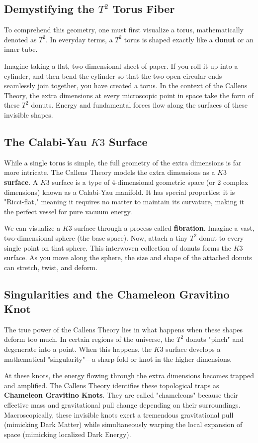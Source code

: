 \documentclass[a4paper,12pt]{article}
\begin{document}
\subsection{Demystifying the $T^2$ Torus Fiber}
To comprehend this geometry, one must first visualize a torus, mathematically denoted as $T^2$. In everyday terms, a $T^2$ torus is shaped exactly like a \textbf{donut} or an inner tube. 

Imagine taking a flat, two-dimensional sheet of paper. If you roll it up into a cylinder, and then bend the cylinder so that the two open circular ends seamlessly join together, you have created a torus. In the context of the Callens Theory, the extra dimensions at every microscopic point in space take the form of these $T^2$ donuts. Energy and fundamental forces flow along the surfaces of these invisible shapes.

\subsection{The Calabi-Yau $K3$ Surface}
While a single torus is simple, the full geometry of the extra dimensions is far more intricate. The Callens Theory models the extra dimensions as a \textbf{$K3$ surface}. A $K3$ surface is a type of 4-dimensional geometric space (or 2 complex dimensions) known as a Calabi-Yau manifold. It has special properties: it is "Ricci-flat," meaning it requires no matter to maintain its curvature, making it the perfect vessel for pure vacuum energy.

We can visualize a $K3$ surface through a process called \textbf{fibration}. Imagine a vast, two-dimensional sphere (the base space). Now, attach a tiny $T^2$ donut to every single point on that sphere. This interwoven collection of donuts forms the $K3$ surface. As you move along the sphere, the size and shape of the attached donuts can stretch, twist, and deform.

\subsection{Singularities and the Chameleon Gravitino Knot}
The true power of the Callens Theory lies in what happens when these shapes deform too much. In certain regions of the universe, the $T^2$ donuts "pinch" and degenerate into a point. When this happens, the $K3$ surface develops a mathematical "singularity"—a sharp fold or knot in the higher dimensions.

At these knots, the energy flowing through the extra dimensions becomes trapped and amplified. The Callens Theory identifies these topological traps as \textbf{Chameleon Gravitino Knots}. They are called "chameleons" because their effective mass and gravitational pull change depending on their surroundings. Macroscopically, these invisible knots exert a tremendous gravitational pull (mimicking Dark Matter) while simultaneously warping the local expansion of space (mimicking localized Dark Energy). 
\end{document}
